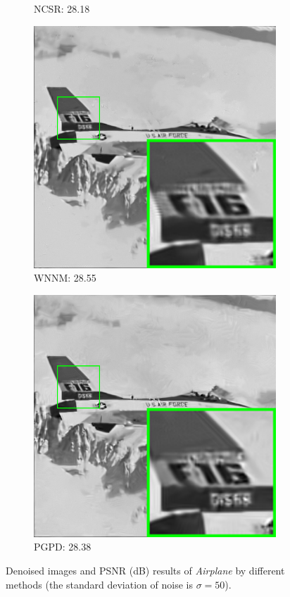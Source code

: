 \begin{figure}
\begin{subfigure}[t]{0.24\textwidth}
		\caption{NCSR: 28.18}
    \end{subfigure}
    \hfill
    \begin{subfigure}[t]{0.24\textwidth}
        \centering
        \includegraphics[width=1\textwidth]{images/pgpd/br_WNNM_50_airplane.png}
		\caption{WNNM: 28.55}
    \end{subfigure}
    \hfill
    \begin{subfigure}[t]{0.24\textwidth}
        \centering
        \includegraphics[width=1\textwidth]{images/pgpd/br_our_50_airplane.png}
		\caption{PGPD: 28.38}
    \end{subfigure}
    \caption{Denoised images and PSNR (dB) results of \textsl{Airplane} by different methods (the standard deviation of noise is $\sigma=50$).}
    \label{fig2-12}
\end{figure}


